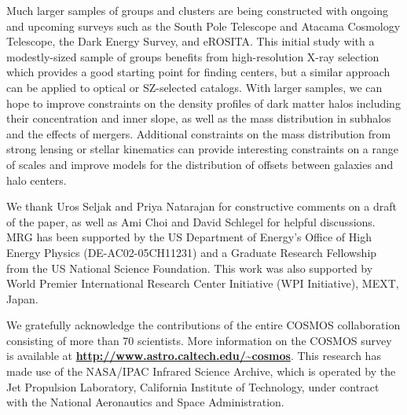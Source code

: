 \documentclass[12pt]{emulateapj}
\begin{document}
Much larger samples of groups and clusters are being constructed with
ongoing and upcoming surveys such as the South Pole Telescope and
Atacama Cosmology Telescope, the Dark Energy Survey, and eROSITA. This
initial study with a modestly-sized sample of groups benefits from
high-resolution X-ray selection which provides a good starting point for finding
centers, but a similar approach can be applied to optical or SZ-selected
catalogs. With larger samples, we can hope to improve constraints on
the density profiles of dark matter halos including their
concentration and inner slope, as well as the mass distribution in
subhalos and the effects of mergers. Additional constraints on the
mass distribution from strong lensing or stellar kinematics can
provide interesting constraints on a range of scales and improve
models for the distribution of offsets between galaxies and halo
centers.

\acknowledgments 
We thank Uros Seljak and Priya Natarajan for
constructive comments on a draft of the paper, as well as Ami Choi and
David Schlegel for helpful discussions. MRG has been
supported by the US Department of Energy's Office of High Energy
Physics (DE-AC02-05CH11231) and a Graduate Research Fellowship from
the US National Science Foundation. This work was also supported by World Premier
International Research Center Initiative (WPI Initiative), MEXT,
Japan.

We gratefully acknowledge the contributions of the entire COSMOS
collaboration consisting of more than 70 scientists. More information
on the COSMOS survey is available at {\bf
  \url{http://www.astro.caltech.edu/~cosmos}}.  This research has made
use of the NASA/IPAC Infrared Science Archive, which is operated by
the Jet Propulsion Laboratory, California Institute of Technology,
under contract with the National Aeronautics and Space Administration.

\mbox{~} %



%




\end{document}
